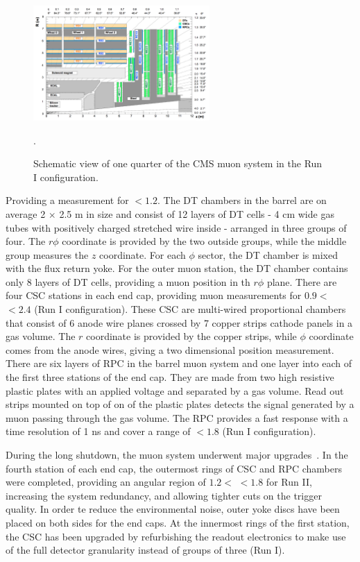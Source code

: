 \begin{figure}[ht!]
	\centering
	\includegraphics[width=0.6\textwidth]{2_ExperimentalSetup/Figures/muonsys}
	\caption{Schematic view of one quarter of the CMS muon system in the Run I configuration. \cite{Chatrchyan:1223944}}.
	\label{fig:muonsys}
\end{figure}


Providing a measurement for \abspsrap $<1.2$. The DT chambers in the barrel are on average 2 $\times$ 2.5 \si{ \meter} in size and consist of 12 layers of DT cells - 4 \si{ \centi \meter} wide gas tubes with positively charged stretched wire inside - arranged in three groups of four. The $r\phi$ coordinate is provided by the two outside groups, while the middle group measures the $z$ coordinate. For each $\phi$ sector, the DT chamber is mixed with the flux return yoke. For the outer muon station, the DT chamber contains only 8 layers of DT cells, providing a muon position in th $r\phi$ plane.
There are four CSC stations in each end cap, providing muon measurements for $0.9<$ \abspsrap $<2.4$ (Run I configuration). These CSC are multi-wired proportional chambers that consist of 6 anode wire planes crossed by 7 copper strips cathode panels in a gas volume. The $r$ coordinate is provided by the copper strips, while $\phi$ coordinate comes from the anode wires, giving a two dimensional position measurement. 
There are six layers of RPC in the barrel muon system and one layer into each of the first three stations of the end cap. They are made from two high resistive plastic plates with an applied voltage and separated by a gas volume. Read out strips mounted on top of on of the plastic plates detects the signal generated by a muon passing through the gas volume. The RPC provides a fast response with a time resolution of 1 \si{ \nano \second} and cover a range of \abspsrap $<1.8$ (Run I configuration). 


During the long shutdown, the  muon system underwent major upgrades~\cite{Guiducci:1966038,Battilana:2239185}. In the fourth station of each end cap, the outermost rings of CSC and RPC chambers were completed, providing an angular region of $1.2<$ \abspsrap $<1.8$ for Run II, increasing the system redundancy, and allowing tighter cuts on the trigger quality. In order te reduce the environmental noise, outer yoke discs have been placed on both sides for the end caps. 
At the innermost rings of the first station, the CSC has been upgraded by refurbishing the readout electronics to make use of the full detector granularity instead of groups of three (Run I). 


